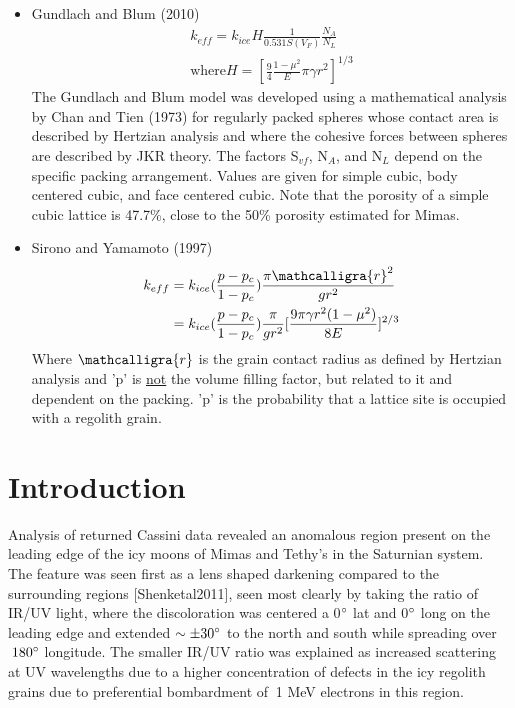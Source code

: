 \documentclass[11pt]{article} %
\newcommand{\vf}{\ensuremath{V_{F}}\xspace}
\newcommand{\sr}{\ensuremath{\mathcalligra{r}} \xspace}
\begin{document}
\begin{itemize}
	\item Gundlach and Blum (2010)
		\begin{equation}
		\begin{split}
		k_{eff} = k_{ice} H \frac{1}{0.531 S(\vf)} \frac{N_{A}}{N_{L}} \\
		\text{where} H = [\frac{9}{4} \frac{1-\mu^{2}}{E} \pi \gamma r^{2} ]^{1/3}
		\end{split}
		\end{equation}
	The Gundlach and Blum model was developed using a mathematical analysis by Chan and Tien (1973) for regularly packed spheres whose contact area is described by Hertzian analysis and where the cohesive forces between spheres are described by JKR theory. The factors S$_{vf}$, N$_{A}$, and N$_{L}$ depend on the specific packing arrangement. Values are given for simple cubic, body centered cubic, and face centered cubic. Note that the porosity of a simple cubic lattice is 47.7\%, close to the 50\% porosity estimated for Mimas. 
	
	\item Sirono and Yamamoto (1997)
		\begin{equation}
		\begin{split}
		k_{eff} &= k_{ice} ( \frac{p - p_{c}}{1-p_{c}} )\frac{\pi \sr^{2}}{g r^{2}} \\
			 &= k_{ice} ( \frac{p - p_{c}}{1-p_{c}} )\frac{\pi}{g r^{2}}[ \frac{9 \pi \gamma r^{2} (1-\mu^{2})}{8 E} ]^{2/3}
		\end{split}
		\end{equation}
		Where \sr is the grain contact radius as defined by Hertzian analysis and 'p' is \underline{not} the volume filling factor, but related to it and dependent on the packing. 'p' is the probability that a lattice site is occupied with a regolith grain. 
	\end{itemize}

\newpage
\section{Introduction}
\label{sec:intro}

	Analysis of returned Cassini data revealed an anomalous region present on the leading edge of the icy moons of Mimas and Tethy's in the Saturnian system. The feature was seen first as a lens shaped darkening compared to the surrounding regions [Shenketal2011], seen most clearly by taking the ratio of IR/UV light, where the discoloration was centered a 0$\degree$ lat and 0$\degree$ long on the leading edge and extended $\sim \pm30\degree$ to the north and south while spreading over $\>180 \degree$ longitude. The smaller IR/UV ratio was explained as  increased scattering at UV wavelengths due to a higher concentration of defects in the icy regolith grains due to preferential bombardment of $\>$1 MeV electrons in this region.
\end{document}
